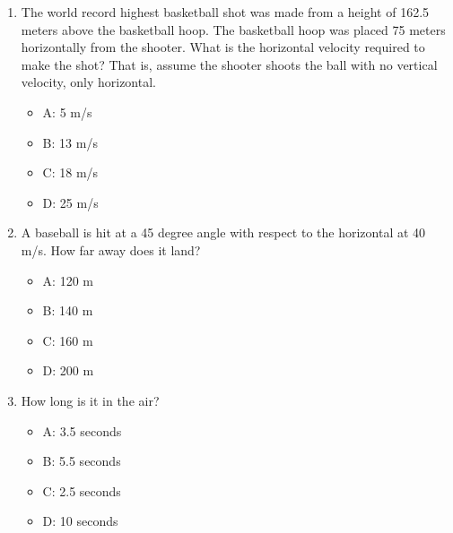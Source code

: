 \documentclass[10pt]{article}
\begin{document}
\begin{enumerate}
\item The world record highest basketball shot was made from a height of 162.5 meters above the basketball hoop.  The basketball hoop was placed 75 meters horizontally from the shooter.  What is the horizontal velocity required to make the shot?  That is, assume the shooter shoots the ball with no vertical velocity, only horizontal.
\begin{itemize}
\item A: 5 m/s
\item B: 13 m/s
\item C: 18 m/s
\item D: 25 m/s
\end{itemize}
\item A baseball is hit at a 45 degree angle with respect to the horizontal at 40 m/s.  How far away does it land?
\begin{itemize}
\item A: 120 m
\item B: 140 m
\item C: 160 m
\item D: 200 m
\end{itemize}
\item How long is it in the air?
\begin{itemize}
\item A: 3.5 seconds
\item B: 5.5 seconds
\item C: 2.5 seconds
\item D: 10 seconds
\end{itemize}
\end{enumerate}
\end{document}
